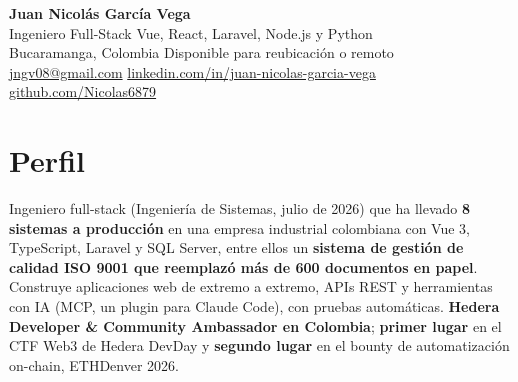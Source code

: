 \documentclass[a4paper,10pt]{article}
\begin{document}
\begin{center}
    {\huge \textbf{Juan Nicolás García Vega}} \\[0.3em]
    Ingeniero Full-Stack \textbar{} Vue, React, Laravel, Node.js y Python \\[0.35em]
    Bucaramanga, Colombia \textperiodcentered{} Disponible para reubicación o remoto \\
    \href{mailto:jngv08@gmail.com}{jngv08@gmail.com} \textperiodcentered{}
    \href{https://www.linkedin.com/in/juan-nicolas-garcia-vega}{linkedin.com/in/juan-nicolas-garcia-vega} \textperiodcentered{}
    \href{https://github.com/Nicolas6879}{github.com/Nicolas6879}
\end{center}

\section*{Perfil}
Ingeniero full-stack (Ingeniería de Sistemas, julio de 2026) que ha llevado
\textbf{8 sistemas a producción} en una empresa industrial colombiana con Vue 3, TypeScript, Laravel y SQL Server, entre
ellos un \textbf{sistema de gestión de calidad ISO 9001 que reemplazó más de 600 documentos en
papel}. Construye aplicaciones web de extremo a extremo, APIs REST y herramientas con IA (MCP,
un plugin para Claude Code), con pruebas automáticas. \textbf{Hedera Developer \& Community
Ambassador en Colombia}; \textbf{primer lugar} en el CTF Web3 de Hedera DevDay y \textbf{segundo
lugar} en el bounty de automatización on-chain, ETHDenver 2026.

\end{document}
